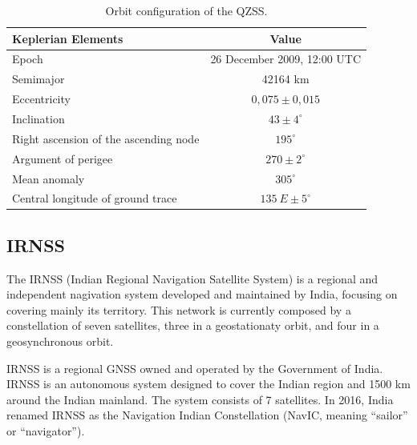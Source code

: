 \begin{table}[!h]
    \centering
    \begin{tabular}{lc}
        \toprule[1.5pt]
        \textbf{Keplerian Elements} & \textbf{Value} \\
        \midrule
        Epoch                                   & 26 December 2009, 12:00 UTC \\
        Semimajor                               & 42164 km \\
        Eccentricity                            & $0,075 \pm 0,015$ \\
        Inclination                             & $43 \pm 4^{\circ}$ \\
        Right ascension of the ascending node   & $195^{\circ}$ \\
        Argument of perigee                     & $270 \pm 2^{\circ}$ \\
        Mean anomaly                            & $305^{\circ}$ \\
        Central longitude of ground trace       & $135\ E \pm 5^{\circ}$ \\
        \bottomrule[1.5pt]
    \end{tabular}
    \caption{Orbit configuration of the QZSS.}
    \label{tab:qzss-orbit-config}
\end{table}

\subsection{IRNSS}

The IRNSS (Indian Regional Navigation Satellite System) \cite{irnss} is a regional and independent nagivation system developed and maintained by India, focusing on covering mainly its territory. This network is currently composed by a constellation of seven satellites, three in a geostationaty orbit, and four in a geosynchronous orbit.

IRNSS is a regional GNSS owned and operated by the Government of India. IRNSS is an autonomous system designed to cover the Indian region and 1500 km around the Indian mainland. The system consists of 7 satellites. In 2016, India renamed IRNSS as the Navigation Indian Constellation (NavIC, meaning ``sailor'' or ``navigator'').

